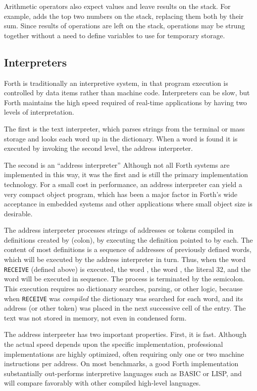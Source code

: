 Arithmetic operators also expect values and leave results on the
stack. For example, \word{+} adds the top two numbers on the stack,
replacing them both by their sum. Since results of operations are
left on the stack, operations may be strung together without a need
to define variables to use for temporary storage.

\subsection{Interpreters} %

Forth is traditionally an interpretive system, in that program
execution is controlled by data items rather than machine code.
Interpreters can be slow, but Forth maintains the high speed required
of real-time applications by having two levels of interpretation.

The first is the text interpreter, which parses strings from the
terminal or mass storage and looks each word up in the dictionary.
When a word is found it is executed by invoking the second level,
the address interpreter.

The second is an ``address interpreter'' Although not all Forth
systems are implemented in this way, it was the first and is still
the primary implementation technology. For a small cost in
performance, an address interpreter can yield a very compact object
program, which has been a major factor in Forth's wide acceptance in
embedded systems and other applications where small object size is
desirable.

The address interpreter processes strings of addresses or tokens
compiled in definitions created by \word{:} (colon), by executing the
definition pointed to by each. The content of most definitions is a
sequence of addresses of previously defined words, which will be
executed by the address interpreter in turn. Thus, when the word
\texttt{RECEIVE} (defined above) is executed, the word ,
the word , the literal 32, and the word  will
be executed in sequence. The process is terminated by the semicolon.
This execution requires no dictionary searches, parsing, or other
logic, because when \texttt{RECEIVE} was \emph{compiled} the
dictionary was searched for each word, and its address (or other
token) was placed in the next successive cell of the entry. The text
was not stored in memory, not even in condensed form.

The address interpreter has two important properties. First, it is
fast. Although the actual speed depends upon the specific
implementation, professional implementations are highly optimized,
often requiring only one or two machine instructions per address.
On most benchmarks, a good Forth implementation substantially
out-performs interpretive languages such as BASIC or LISP, and will
compare favorably with other compiled high-level languages.

